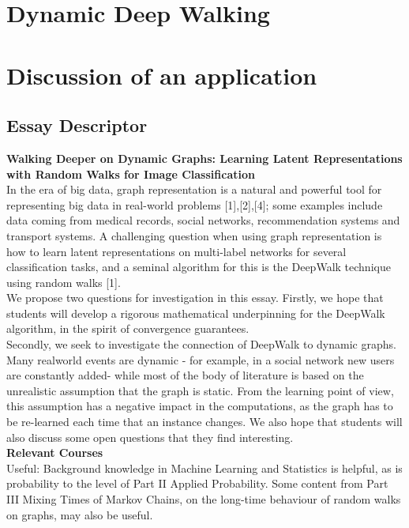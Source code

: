 \documentclass[a4paper]{article}
\begin{document}
\section{Dynamic Deep Walking}
\section{Discussion of an application}
\subsection*{Essay Descriptor}
\textbf{Walking Deeper on Dynamic Graphs: Learning Latent Representations
with Random Walks for Image Classification}\\
In the era of big data, graph representation is a natural and powerful tool for representing big
data in real-world problems [1],[2],[4]; some examples include data coming from medical records,
social networks, recommendation systems and transport systems. A challenging question when
using graph representation is how to learn latent representations on multi-label networks for
several classification tasks, and a seminal algorithm for this is the DeepWalk technique using
random walks [1].\\
We propose two questions for investigation in this essay. Firstly, we hope that students will
develop a rigorous mathematical underpinning for the DeepWalk algorithm, in the spirit of
convergence guarantees.\\
Secondly, we seek to investigate the connection of DeepWalk to dynamic graphs. Many realworld events are dynamic - for example, in a social network new users are constantly added- while
most of the body of literature is based on the unrealistic assumption that the graph is static.
From the learning point of view, this assumption has a negative impact in the computations, as the graph has to be re-learned each time that an instance changes. We also hope that students
will also discuss some open questions that they find interesting.\\
\textbf{Relevant Courses}\\
Useful: Background knowledge in Machine Learning and Statistics is helpful, as is probability
to the level of Part II Applied Probability. Some content from Part III Mixing Times of Markov
Chains, on the long-time behaviour of random walks on graphs, may also be useful.\\






\printindex
\end{document}
